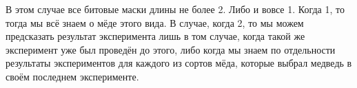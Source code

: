 \begin{enumerate}
\begin{enumerate}
		В этом случае все битовые маски длины не более 2. Либо и вовсе 1. Когда 1, то тогда мы всё знаем о мёде этого вида. В случае, когда 2, то мы можем предсказать результат эксперимента лишь в том случае, когда такой же эксперимент уже был проведён до этого, либо когда мы знаем по отдельности результаты экспериментов для каждого из сортов мёда, которые выбрал медведь в своём последнем эксперименте.
	\end{enumerate}
	
\end{enumerate}



